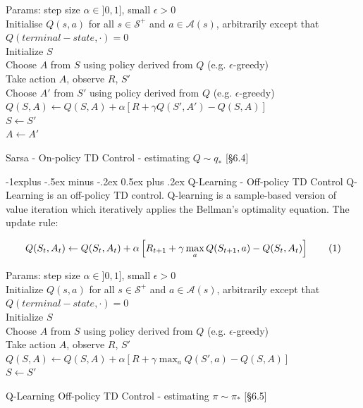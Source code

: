 \documentclass[10pt,landscape]{article}
\makeatletter
\renewcommand{\subsection}{\@startsection{subsection}{2}{0mm}%
                                {-1explus -.5ex minus -.2ex}%
                                {0.5ex plus .2ex}%
                                {\normalfont\normalsize\bfseries}}
\newcommand\numberthis{\addtocounter{equation}{1}\tag{\theequation}}
\makeatother
\begin{document}
\begin{multicols}{3}
\begin{algorithm}[H]
 Params: step size $\alpha \in ]0,1]$, small $\epsilon > 0$ \\
 Initialise $Q(s,a)$ for all $s \in \mathcal{S}^+$ and $a \in \mathcal{A}(s)$, arbitrarily except that $Q(terminal-state, \cdot) = 0$\\
{
    Initialize $S$\\
    Choose $A$ from $S$ using policy derived from $Q$ (e.g. $\epsilon$-greedy)\\
    {
      Take action $A$, observe $R$, $S'$\\
    	Choose $A'$ from $S'$ using policy derived from $Q$ (e.g. $\epsilon$-greedy)\\
      $Q(S, A) \leftarrow Q(S, A) + \alpha \left[R + \gamma Q(S', A') - Q(S, A)  \right]$\\
    	$S \leftarrow S'$\\
    	$A \leftarrow A'$ 
    }
 }
\caption{Sarsa - On-policy TD Control - estimating $Q \sim q_*$  [§6.4]}
\end{algorithm}

\subsection{Q-Learning - Off-policy TD Control}
Q-Learning is an off-policy TD control. 
Q-learning is a sample-based version of value iteration which iteratively applies the Bellman's optimality equation.
The update rule:

\begin{align*}
    Q(S_t, A_t) \leftarrow Q(S_t, A_t) + \alpha \left[R_{t+1} + \gamma \max_a Q(S_{t+1}, a) - Q(S_t, A_t) \right] \numberthis %
\end{align*}

\begin{algorithm}[H]
 Params: step size $\alpha \in ]0,1]$, small $\epsilon > 0$\\
 Initialize $Q(s,a)$ for all $s \in \mathcal{S}^+$ and $a \in \mathcal{A}(s)$, arbitrarily except that $Q(terminal-state, \cdot) = 0$\\
{
    Initialize $S$\\
    {
      Choose $A$ from $S$ using policy derived from $Q$ (e.g. $\epsilon$-greedy)\\
      Take action $A$, observe $R$, $S'$\\
      $Q(S, A) \leftarrow Q(S, A) + \alpha \left[R + \gamma \max_a Q(S', a) - Q(S, A)  \right]$\\
    	$S \leftarrow S'$
    }
 }
\caption{Q-Learning Off-policy TD Control - estimating $\pi \sim \pi_*$  [§6.5]}
\end{algorithm}


\end{multicols}
\end{document}
